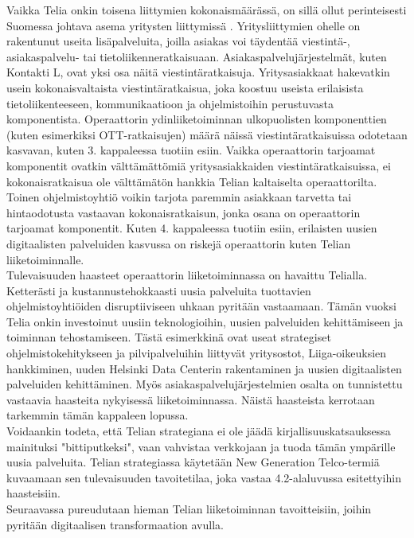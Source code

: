 \documentclass[finnish,12pt,a4paper,pdftex]{article}
\begin{document}
Vaikka Telia onkin toisena liittymien kokonaismäärässä, on sillä ollut perinteisesti Suomessa johtava asema yritysten liittymissä \citep{hesari}. Yritysliittymien ohelle on rakentunut useita lisäpalveluita, joilla asiakas voi täydentää viestintä-, asiakaspalvelu- tai tietoliikenneratkaisuaan. Asiakaspalvelujärjestelmät, kuten Kontakti L, ovat yksi osa näitä viestintäratkaisuja. Yritysasiakkaat hakevatkin usein kokonaisvaltaista viestintäratkaisua, joka koostuu useista erilaisista tietoliikenteeseen, kommunikaatioon ja ohjelmistoihin perustuvasta komponentista. Operaattorin ydinliiketoiminnan ulkopuolisten komponenttien (kuten esimerkiksi OTT-ratkaisujen) määrä näissä viestintäratkaisuissa odotetaan kasvavan, kuten 3. kappaleessa tuotiin esiin. Vaikka operaattorin tarjoamat komponentit ovatkin välttämättömiä yritysasiakkaiden viestintäratkaisuissa, ei kokonaisratkaisua ole välttämätön hankkia Telian kaltaiselta operaattorilta. Toinen ohjelmistoyhtiö voikin tarjota paremmin asiakkaan tarvetta tai hintaodotusta vastaavan kokonaisratkaisun, jonka osana on operaattorin tarjoamat komponentit. Kuten 4. kappaleessa tuotiin esiin, erilaisten uusien digitaalisten palveluiden kasvussa on riskejä operaattorin kuten Telian liiketoiminnalle.\\

Tulevaisuuden haasteet operaattorin liiketoiminnassa on havaittu Telialla. Ketterästi ja kustannustehokkaasti uusia palveluita tuottavien ohjelmistoyhtiöiden disruptiiviseen uhkaan pyritään vastaamaan.
Tämän vuoksi Telia onkin investoinut uusiin teknologioihin, uusien palveluiden kehittämiseen ja toiminnan tehostamiseen. Tästä esimerkkinä ovat useat strategiset ohjelmistokehitykseen ja pilvipalveluihin liittyvät yritysostot, Liiga-oikeuksien hankkiminen, uuden Helsinki Data Centerin rakentaminen ja uusien digitaalisten palveluiden kehittäminen. Myös asiakaspalvelujärjestelmien osalta on tunnistettu vastaavia haasteita nykyisessä liiketoiminnassa. Näistä haasteista kerrotaan tarkemmin tämän kappaleen lopussa.\\

Voidaankin todeta, että Telian strategiana ei ole jäädä kirjallisuuskatsauksessa mainituksi "bittiputkeksi", vaan vahvistaa verkkojaan ja tuoda tämän ympärille uusia palveluita. Telian strategiassa käytetään New Generation Telco-termiä kuvaamaan sen tulevaisuuden tavoitetilaa, joka vastaa 4.2-alaluvussa esitettyihin haasteisiin.\\

Seuraavassa pureudutaan hieman Telian liiketoiminnan tavoitteisiin, joihin pyritään digitaalisen transformaation avulla.
\end{document}
